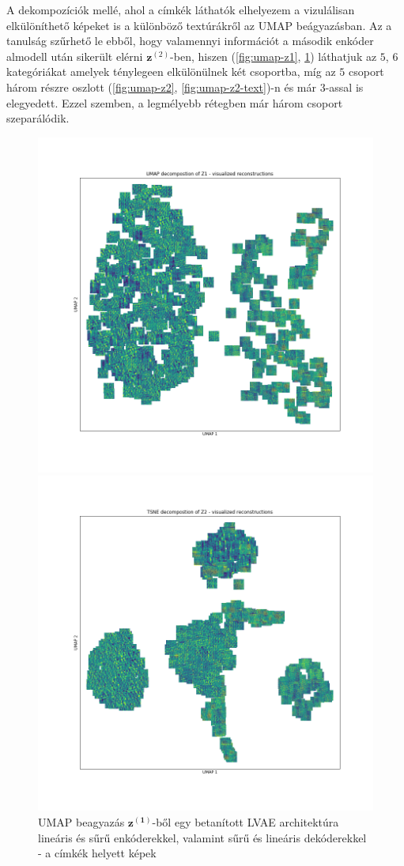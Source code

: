 \documentclass[12pt, english]{article}
\begin{document}
\vspace{4mm}

\par A dekompozíciók mellé, ahol a címkék láthatók elhelyezem a vizulálisan elkülöníthető képeket is a különböző textúrákről az UMAP beágyazásban. Az a tanulság szűrhető le ebből, hogy valamennyi információt a második enkóder almodell után sikerült elérni $\bm{z}^{(2)}$-ben, hiszen (\ref{fig:umap-z1}, \ref{fig:umap-z1-text}) láthatjuk az $5$, $6$ kategóriákat amelyek ténylegeen elkülönülnek két csoportba, míg az $5$ csoport három részre oszlott (\ref{fig:umap-z2}, \ref{fig:umap-z2-text})-n és már $3$-assal is elegyedett. Ezzel szemben, a legmélyebb rétegben már három csoport szeparálódik.

\vspace{4mm}

\begin{figure}[H] 
  \begin{minipage}{0.48\linewidth}
    \centering
    \includegraphics[width=.7\linewidth]{umap_z1_dense_lin_lin_no_norm_textures.png}
    \caption{UMAP beagyazás $\bm{z^{(1)}}$-ből egy betanított LVAE architektúra lineáris és sűrű enkóderekkel, valamint sűrű és lineáris dekóderekkel - a címkék helyett képek}
    \label{fig:umap-z1-text}
  \end{minipage}\hfill
  \begin{minipage}{0.48\linewidth}
    \centering
    \includegraphics[width=.7\linewidth]{umap_z2_dense_lin_lin_no_norm_textures.png} 

\end{minipage}
\end{figure}
\end{document}
